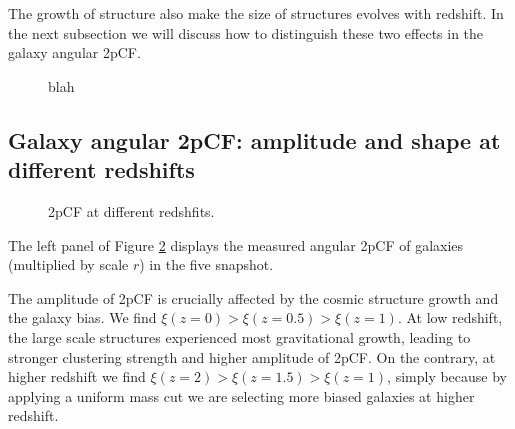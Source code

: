 \documentclass[iop]{emulateapj}
\begin{document}
The growth of structure also make the size of structures evolves with redshift.
In the next subsection we will discuss how to distinguish these two effects in the galaxy angular 2pCF.

\begin{figure}
   \caption{\label{fig_scatter}
  blah
   }
\end{figure}


\subsection{Galaxy angular 2pCF: amplitude and shape at different redshifts}


\begin{figure}
   \caption{\label{fig_diffz}
  2pCF at different redshfits.
   }
\end{figure}

The left panel of Figure \ref{fig_diffz} displays the measured angular 2pCF of galaxies (multiplied by scale $r$) in the five snapshot.

The amplitude of 2pCF is crucially affected by the cosmic structure growth and the galaxy bias.
We find $\xi(z=0)>\xi(z=0.5)>\xi(z=1)$.
At low redshift, the large scale structures experienced most gravitational growth,
leading to stronger clustering strength and higher amplitude of 2pCF.
On the contrary, at higher redshift we find $\xi(z=2)>\xi(z=1.5)>\xi(z=1)$,
simply because by applying a uniform mass cut we are selecting more biased galaxies at higher redshift.
\end{document}
